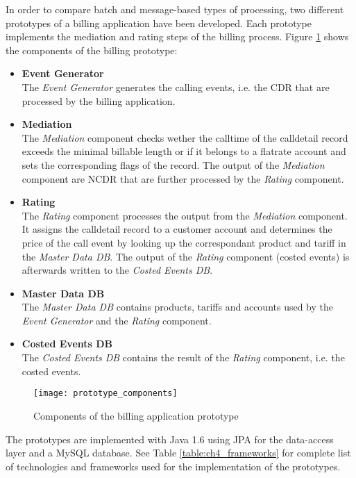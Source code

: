 In order to compare batch and message-based types of processing, two different prototypes of a billing application have been developed. Each prototype implements the mediation and rating steps of the billing process. Figure \ref{fig:ch4_prototype_components} shows the components of the billing prototype: 
\begin{itemize}
	\item \textbf{Event Generator}\\
	The \emph{Event Generator} generates the calling events, i.e. the \ac{CDR} that are processed by the billing application.
	\item \textbf{Mediation}\\
	The \emph{Mediation} component checks wether the calltime of the calldetail record exceeds the minimal billable length or if it belongs to a flatrate account and sets the corresponding flags of the record. The output of the \emph{Mediation} component are \ac{NCDR} that are further processed by the \emph{Rating} component.
	\item \textbf{Rating}\\
	The \emph{Rating} component processes the output from the \emph{Mediation} component. It assigns the calldetail record to a customer account and determines the price of the call event by looking up the correspondant product and tariff in the \emph{Master Data DB}. The output of the \emph{Rating} component (costed events) is afterwards written to the \emph{Costed Events DB}.
	\item \textbf{Master Data DB}\\
	The \emph{Master Data DB} contains products, tariffs and accounts used by the \emph{Event Generator} and the \emph{Rating} component.
	\item \textbf{Costed Events DB}\\
	The \emph{Costed Events DB} contains the result of the \emph{Rating} component, i.e. the costed events.
\end{itemize}

\begin{figure}[htbp]
	\centering
	\texttt{[image: prototype\_components]}
	\caption{Components of the billing application prototype}
	\label{fig:ch4_prototype_components}
\end{figure}

The prototypes are implemented with Java 1.6 using \ac{JPA} for the data-access layer and a MySQL database. See Table \ref{table:ch4_frameworks} for complete list of technologies and frameworks used for the implementation of the prototypes.

